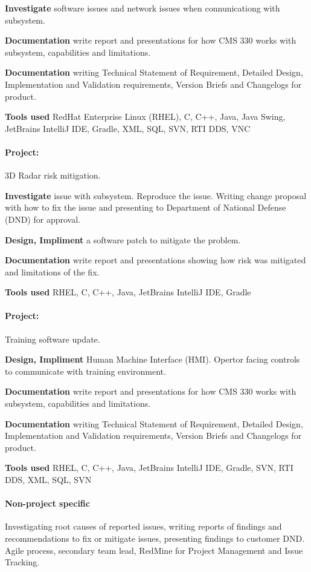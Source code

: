 \documentclass[12pt %
]{article}
\begin{document}
\textbf{Investigate} software issues and network issues when connunicationg with subsystem.

\textbf{Documentation} write report and presentations for how CMS 330 works with subsystem, capabilities and limitations.

\textbf{Documentation} writing Technical Statement of Requirement, Detailed Design, Implementation and Validation requirements, Version Briefs and Changelogs for product.

\textbf{Tools used} RedHat Enterprise Linux (RHEL), C, C++, Java, Java Swing, JetBrains IntelliJ IDE, Gradle, XML, SQL, SVN, RTI DDS, VNC

\paragraph{Project:} 3D Radar risk mitigation.

\textbf{Investigate} issue with subsystem. Reproduce the issue. Writing change proposal with how to fix the issue and presenting to Department of National Defense (DND) for approval.

\textbf{Design, Impliment} a software patch to mitigate the problem.

\textbf{Documentation} write report and presentations showing how risk was mitigated and limitations of the fix.

\textbf{Tools used} RHEL, C, C++, Java, JetBrains IntelliJ IDE, Gradle

\paragraph{Project:} Training software update.

\textbf{Design, Impliment} Human Machine Interface (HMI). Opertor facing controls to communicate with training environment.

\textbf{Documentation} write report and presentations for how CMS 330 works with subsystem, capabilities and limitations.

\textbf{Documentation} writing Technical Statement of Requirement, Detailed Design, Implementation and Validation requirements, Version Briefs and Changelogs for product.

\textbf{Tools used} RHEL, C, C++, Java, JetBrains IntelliJ IDE, Gradle, SVN, RTI DDS, XML, SQL, SVN

\paragraph{Non-project specific} Investigating root causes of reported issues, writing reports of findings and recommendations to fix or mitigate issues, presenting findings to customer DND. Agile process, secondary team lead, RedMine for Project Management and Issue Tracking.
\end{document}
